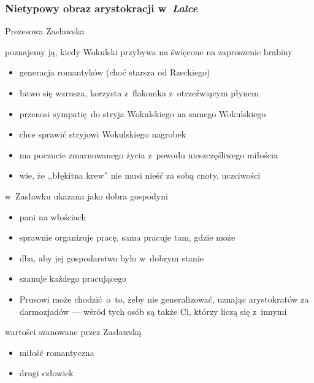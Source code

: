 \subsubsection*{Nietypowy obraz arystokracji w~\textit{Lalce}}
\begin{description}
    \item Prezesowa Zasławska
        \begin{description}
            \item poznajemy ją, kiedy Wokulski przybywa na święcone na zaproszenie hrabiny
                \begin{itemize}
                    \item generacja romantyków (choć starsza od Rzeckiego)
                    \item łatwo się wzrusza, korzysta z~flakonika z~otrzeźwiącym płynem
                    \item przenosi sympatię do stryja Wokulskiego na samego Wokulskiego
                    \item chce sprawić stryjowi Wokulskiego nagrobek
                    \item ma poczucie zmarnowanego życia z~powodu nieszczęśliwego miłościa
                    \item wie, że ,,błękitna krew'' nie musi nieść za sobą cnoty, uczciwości
                \end{itemize}
            \item w~Zasławku ukazana jako dobra gospodyni
                \begin{itemize}
                    \item pani na włościach
                    \item sprawnie organizuje pracę, sama pracuje tam, gdzie może
                    \item dba, aby jej gospodarstwo było w~dobrym stanie
                    \item szanuje każdego pracującego
                    \item Prusowi może chodzić o~to, żeby nie generalizować, uznając arystokratów za darmozjadów --- wśród tych osób są także Ci, którzy liczą się z~innymi
                \end{itemize}
            \item wartości szanowane przez Zasławską
                \begin{itemize}
                    \item miłość romantyczna
                    \item drugi człowiek

\end{itemize}
\end{description}
\end{description}
